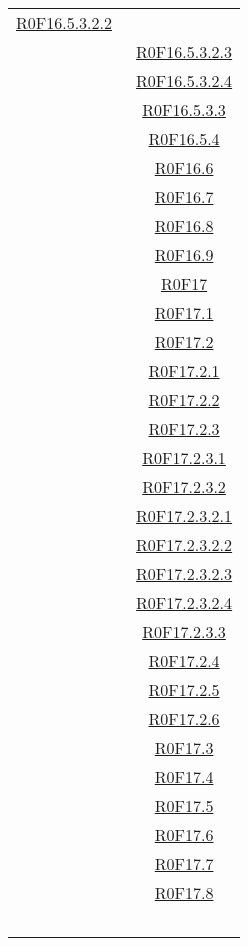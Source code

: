 \documentclass[../AnalisiDeiRequisiti.tex]{subfiles}
\begin{document}
\begin{longtable}{|c|c|}
	\hyperlink{R0F16.5.3.2.2}{R0F16.5.3.2.2}\\& \
	\hyperlink{R0F16.5.3.2.3}{R0F16.5.3.2.3}\\& \
	\hyperlink{R0F16.5.3.2.4}{R0F16.5.3.2.4}\\& \
	\hyperlink{R0F16.5.3.3}{R0F16.5.3.3}\\& \
	\hyperlink{R0F16.5.4}{R0F16.5.4}\\& \
	\hyperlink{R0F16.6}{R0F16.6}\\& \
	\hyperlink{R0F16.7}{R0F16.7}\\& \
	\hyperlink{R0F16.8}{R0F16.8}\\& \
	\hyperlink{R0F16.9}{R0F16.9}\\& \
	\hyperlink{R0F17}{R0F17}\\& \
	\hyperlink{R0F17.1}{R0F17.1}\\& \
	\hyperlink{R0F17.2}{R0F17.2}\\& \
	\hyperlink{R0F17.2.1}{R0F17.2.1}\\& \
	\hyperlink{R0F17.2.2}{R0F17.2.2}\\& \
	\hyperlink{R0F17.2.3}{R0F17.2.3}\\& \
	\hyperlink{R0F17.2.3.1}{R0F17.2.3.1}\\& \
	\hyperlink{R0F17.2.3.2}{R0F17.2.3.2}\\& \
	\hyperlink{R0F17.2.3.2.1}{R0F17.2.3.2.1}\\& \
	\hyperlink{R0F17.2.3.2.2}{R0F17.2.3.2.2}\\& \
	\hyperlink{R0F17.2.3.2.3}{R0F17.2.3.2.3}\\& \
	\hyperlink{R0F17.2.3.2.4}{R0F17.2.3.2.4}\\& \
	\hyperlink{R0F17.2.3.3}{R0F17.2.3.3}\\& \
	\hyperlink{R0F17.2.4}{R0F17.2.4}\\& \
	\hyperlink{R0F17.2.5}{R0F17.2.5}\\& \
	\hyperlink{R0F17.2.6}{R0F17.2.6}\\& \
	\hyperlink{R0F17.3}{R0F17.3}\\& \
	\hyperlink{R0F17.4}{R0F17.4}\\& \
	\hyperlink{R0F17.5}{R0F17.5}\\& \
	\hyperlink{R0F17.6}{R0F17.6}\\& \
	\hyperlink{R0F17.7}{R0F17.7}\\& \
	\hyperlink{R0F17.8}{R0F17.8}\\& \

\end{longtable}
\end{document}
